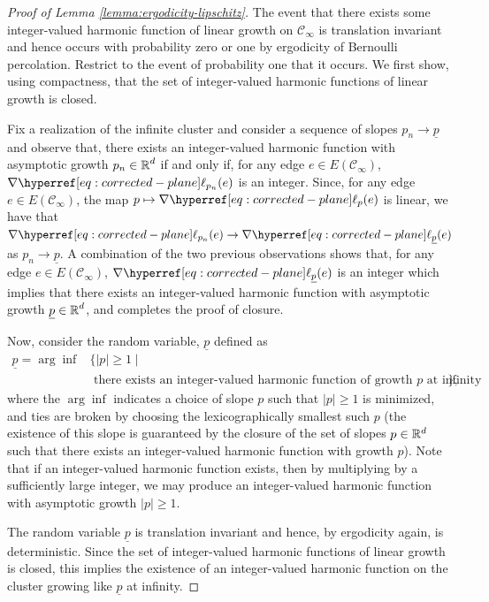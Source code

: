 \documentclass[12pt]{amsart}
\numberwithin{equation}{section}
\begin{document}
	\begin{proof}[Proof of Lemma \ref{lemma:ergodicity-lipschitz}]
		The event that there exists some integer-valued harmonic function of linear growth on $\mathscr{C}_{\infty}$ is translation invariant and hence occurs with probability zero or one by ergodicity of Bernoulli percolation. Restrict to the event of probability one that it occurs. We first show, using compactness, that the set of integer-valued harmonic functions of linear growth is closed. 
		
		Fix a realization of the infinite cluster and consider a sequence of slopes $p_n \to \underline{p}$ and observe that, there exists an integer-valued harmonic function with asymptotic growth $p_n \in \operatorname{\mathbb{R}}^d$ if and only if, for any edge $e \in E \left( \mathscr{C}_\infty \right)$, $\nabla \ellp{p_n}(e)$ is an integer. Since, for any edge $e \in E \left( \mathscr{C}_\infty \right)$, the map $p \mapsto \nabla \ellp{p}(e)$ is linear, we have that $\nabla \ellp{p_n}(e) \to \nabla \ellp{\underline{p}}(e)$ as $p_n \to \underline{p}$. A combination of the two previous observations shows that, for any edge $e \in E\left( \mathscr{C}_\infty \right)$, $\nabla \ellp{\underline{p}}(e)$ is an integer which implies that there exists an integer-valued harmonic function with asymptotic growth $\underline{p} \in \operatorname{\mathbb{R}}^d$, and completes the proof of closure. 
		
		Now, consider the random variable, $\underline{p}$ defined as
		\[
		\begin{aligned}
			\underline{p} = \arg \inf &\{  |p| \geq 1 \mid \\
			& \mbox{ there exists an integer-valued
				harmonic function of growth $p$ at infinity} \},
		\end{aligned}
		\]
		where the $\arg \inf$ indicates a choice of slope $p$ such that $|p| \geq 1$ is minimized, 
		and ties are broken by choosing the lexicographically smallest such $p$ (the existence of this slope is guaranteed by the closure of the set of slopes $p \in \mathbb{R}^d$ such that there exists an integer-valued harmonic function with growth $p$). Note that if an integer-valued harmonic function exists, then by multiplying
		by a sufficiently large integer, we may produce an integer-valued harmonic function with asymptotic growth $|p| \geq 1$. 
		
		The random variable $\underline{p}$ is translation invariant and hence, by ergodicity again, is deterministic.
		Since the set of integer-valued harmonic functions of linear growth is closed, this implies the existence of an integer-valued harmonic function 
		on the cluster growing like $\underline{p}$ at infinity.
	\end{proof}
	
\end{document}
